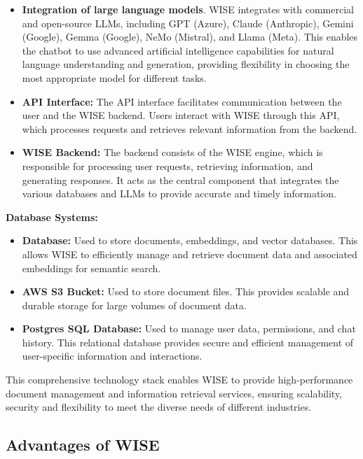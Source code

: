 \begin{itemize}
    \item \textbf{Integration of large language models}. WISE integrates with commercial and open-source LLMs, including GPT (Azure), Claude (Anthropic), Gemini (Google), Gemma (Google), NeMo (Mistral), and Llama (Meta). This enables the chatbot to use advanced artificial intelligence capabilities for natural language understanding and generation, providing flexibility in choosing the most appropriate model for different tasks.

    \item \textbf{API Interface:} The API interface facilitates communication between the user and the WISE backend. Users interact with WISE through this API, which processes requests and retrieves relevant information from the backend.

    \item \textbf{WISE Backend:} The backend consists of the WISE engine, which is responsible for processing user requests, retrieving information, and generating responses. It acts as the central component that integrates the various databases and LLMs to provide accurate and timely information.
\end{itemize}

\textbf{Database Systems:} 

\begin{itemize}
    \item \textbf{Database: } Used to store documents, embeddings, and vector databases. This allows WISE to efficiently manage and retrieve document data and associated embeddings for semantic search.
    \item \textbf{AWS S3 Bucket:} Used to store document files. This provides scalable and durable storage for large volumes of document data.
    \item \textbf{Postgres SQL Database:} Used to manage user data, permissions, and chat history. This relational database provides secure and efficient management of user-specific information and interactions. \cite{hpa2024}
\end{itemize}

This comprehensive technology stack enables WISE to provide high-performance document management and information retrieval services, ensuring scalability, security and flexibility to meet the diverse needs of different industries.

\subsection{Advantages of WISE}

